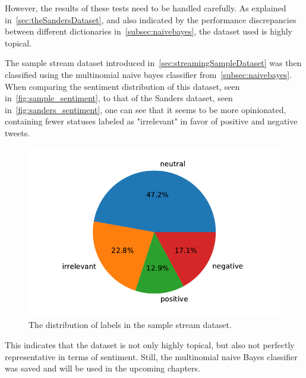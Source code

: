However, the results of these tests need to be handled carefully.
As explained in~\autoref{sec:theSandersDataset},
and also indicated by the performance discrepancies between different dictionaries in~\autoref{subsec:naivebayes},
the dataset used is highly topical.

The sample stream dataset introduced in~\autoref{sec:streamingSampleDataset} was then classified using the multinomial naive bayes classifier from~\autoref{subsec:naivebayes}.
When comparing the sentiment distribution of this dataset, seen in~\autoref{fig:sample_sentiment},
to that of the Sanders dataset, seen in~\autoref{fig:sanders_sentiment},
one can see that it seems to be more opinionated,
containing fewer statuses labeled as "irrelevant" in favor of positive and negative tweets.

\begin{figure}
    \centering
    \caption{The distribution of labels in the sample stream dataset.}
    \label{fig:sample_sentiment}
    \includegraphics[width=12cm]{../figures/sample_sentiment.pdf}
\end{figure}

This indicates that the dataset is not only highly topical, but also not perfectly representative in terms of sentiment.
Still, the multinomial naive Bayes classifier was saved and will be used in the upcoming chapters.
